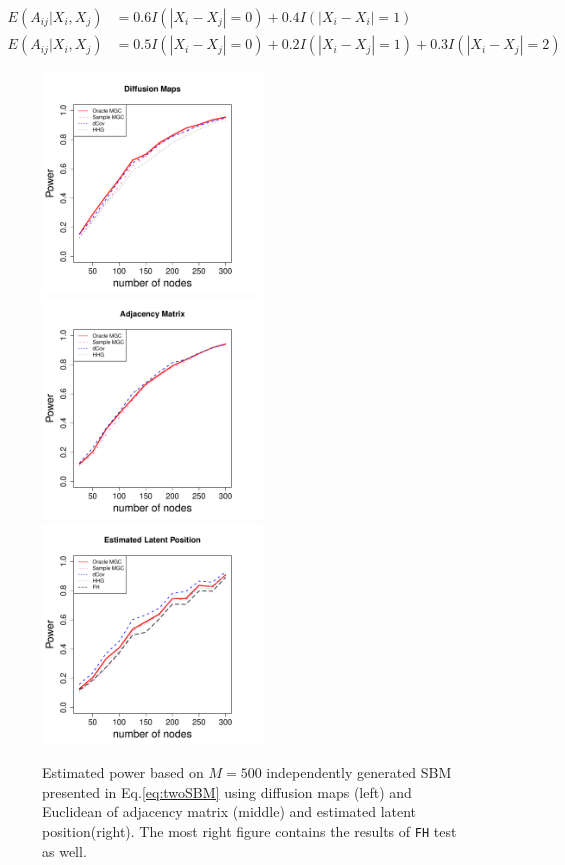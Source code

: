\documentclass[12pt]{article}
\theoremstyle{definition}
\begin{document}
\begin{equation}
\begin{aligned}
E(A_{ij} | X_{i}, X_{j}) &  =  0.6 I(|X_{i} - X_{j}| = 0) + 0.4 I(|X_{i} - X_{i}| = 1)  \\
E(A_{ij} | X_{i}, X_{j}) & = 0.5 I(|X_{i} - X_{j}| = 0) + 0.2 I(|X_{i} - X_{j}| = 1) + 0.3 I(|X_{i} - X_{j}| = 2)
\end{aligned}
\end{equation}

\begin{figure}[H]
	\centering
	\includegraphics[width=2.3in]{../Figure/twoSBM.pdf}
	\includegraphics[width=2.3in]{../Figure/EtwoSBM.pdf}
	\includegraphics[width =2.3in]{../Figure/ftwoSBM.pdf}
	\caption{Estimated power based on $M = 500$ independently generated SBM presented in Eq.\ref{eq:twoSBM} using diffusion maps (left) and Euclidean of adjacency matrix (middle)  and estimated latent position(right). The most right figure contains the results of \texttt{FH} test as well.}
		\label{fig:twoSBM}
\end{figure}
\end{document}
